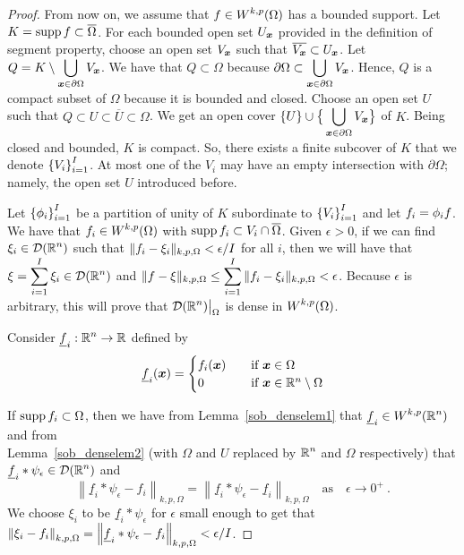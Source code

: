 \begin{proof}
 From now on, we assume that $\displaystyle f \in W^{k,p}(\Omega)$
has a bounded support.  Let
$\displaystyle K = \operatorname{supp} f \subset \overline{\Omega}$.
For each bounded open set $U_{{\bm{x}}}$ provided in the definition of
segment property, choose an open set
$V_{{\bm{x}}}$ such that
$\displaystyle \overline{V_{{\bm{x}}}} \subset U_{{\bm{x}}}$.
Let
$\displaystyle Q = K \setminus \bigcup_{{\bm{x}} \in \partial \Omega} V_{{\bm{x}}}$.
We have that $Q \subset \Omega$ because
$\displaystyle \partial \Omega \subset \bigcup_{{\bm{x}}
\in \partial \Omega} V_{{\bm{x}}}$.
Hence, $Q$ is a compact subset of $\Omega$ because it is
bounded and closed.  Choose an open set $U$ such that
$Q \subset U \subset \overline{U} \subset \Omega$.
We get an open cover $\displaystyle \left\{U\right\} \cup
\big\{ \bigcup_{{\bm{x}} \in \partial \Omega} V_{{\bm{x}}} \big\}$ of $K$.
Being closed and bounded, $K$ is compact.  So, there exists a finite
subcover of $K$ that we denote $\displaystyle \left\{ V_i \right\}_{i=1}^I$.
At most one of the $V_i$ may have an empty intersection with $\partial \Omega$;
namely, the open set $U$ introduced before.

Let $\displaystyle \left\{ \phi_i \right\}_{i=1}^I$ be a partition
of unity of $K$ subordinate to $\displaystyle \left\{ V_i \right\}_{i=1}^I$
and let $\displaystyle f_i = \phi_i f$.  We have that
$\displaystyle f_i \in W^{k,p}(\Omega)$ with
$\operatorname{supp} f_i \subset V_i \cap \overline{\Omega}$.
Given $\epsilon >0$, if we can find $\displaystyle \xi_i \in \mathcal{D}(\mathbb{R}^n)$
such that $\displaystyle \|f_i - \xi_i\|_{k,p,\Omega} < \epsilon/I$ for all $i$,
then we will have that $\displaystyle \xi = \sum_{i=1}^I \xi_i \in \mathcal{D}(\mathbb{R}^n)$
and $\displaystyle \|f - \xi\|_{k,p,\Omega}
\leq \sum_{i=1}^I \|f_i - \xi_i\|_{k,p,\Omega} < \epsilon$.  Because
$\epsilon$ is arbitrary, this will prove that
$\displaystyle \mathcal{D}(\mathbb{R}^n)\big|_{\Omega}$ is dense in
$\displaystyle W^{k,p}(\Omega)$.

Consider $\displaystyle \underline{f}_i : \mathbb{R}^n \to \mathbb{R}$ defined by
\[
\underline{f}_i({\bm{x}})
= \begin{cases}
f_i({\bm{x}}) & \quad \text{if} \ {\bm{x}} \in \Omega \\
0 & \quad \text{if} \ {\bm{x}} \in \mathbb{R}^n \setminus \Omega
\end{cases}
\]

If $\operatorname{supp} f_i \subset \Omega$, then we have from
Lemma~\ref{sob_denselem1} that
$\displaystyle \underline{f}_i \in W^{k,p}(\mathbb{R}^n)$
and from\\
Lemma~\ref{sob_denselem2} (with $\Omega$ and $U$ replaced by
$\displaystyle \mathbb{R}^n$ and $\Omega$ respectively) that
$\displaystyle \underline{f}_i \ast \psi_\epsilon \in \mathcal{D}(\mathbb{R}^n)$ and
\[
\left\| \underline{f}_i \ast \psi_\epsilon - f_i \right\|_{k,p,\Omega}
= \left\| \underline{f}_i \ast \psi_\epsilon
- \underline{f}_i \right\|_{k,p,\Omega}
\quad \text{as} \quad \epsilon \to 0^+ \ .
\]
We choose $\xi_i$ to be $\underline{f}_i \ast \psi_\epsilon$
for $\epsilon$ small enough to get that
$\displaystyle \left\|\xi_i - f_i\right\|_{k,p,\Omega}
= \left\| \underline{f}_i \ast \psi_\epsilon - f_i \right\|_{k,p,\Omega}
< \epsilon/I$.


\end{proof}
